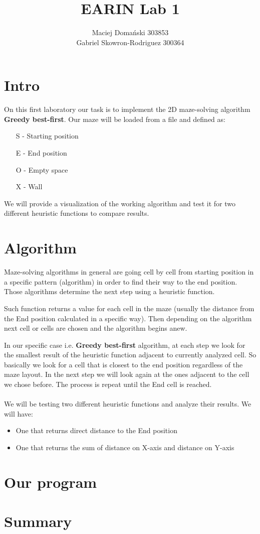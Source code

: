 \documentclass{article}
\title{EARIN Lab 1}
\author{Maciej Domański 303853 \\ Gabriel Skowron-Rodriguez 300364}
\begin{document}
\maketitle

\section{Intro}

On this first laboratory our task is to implement the 2D maze-solving algorithm \textbf{Greedy best-first}.
Our maze will be loaded from a file and defined as:
\begin{itemize}
    \item[S] - Starting position
    \item[E] - End position
    \item[O] - Empty space
    \item[X] - Wall
\end{itemize}

We will provide a visualization of the working algorithm and test it for two different heuristic functions to compare results.

\section{Algorithm}

Maze-solving algorithms in general are going cell by cell from starting position in a specific pattern (algorithm) in order to find their way to the end position.
Those algorithms determine the next step using a heuristic function.

Such function returns a value for each cell in the maze (usually the distance from the End position calculated in a specific way).
Then depending on the algorithm next cell or cells are chosen and the algorithm begins anew.

In our specific case i.e. \textbf{Greedy best-first} algorithm, at each step we look for the smallest result of the heuristic function adjacent to currently analyzed cell.
So basically we look for a cell that is closest to the end position regardless of the maze layout.
In the next step we will look again at the ones adjacent to the cell we chose before.
The process is repeat until the End cell is reached.
\\\\
We will be testing two different heuristic functions and analyze their results.
We will have:
\begin{itemize}
    \item One that returns direct distance to the End position
    \item One that returns the sum of distance on X-axis and distance on Y-axis
\end{itemize}

\section{Our program}


\section{Summary}
\end{document}
